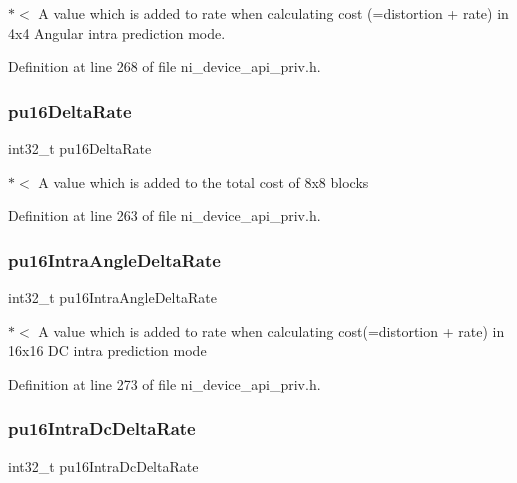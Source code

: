 $\ast$$<$ A value which is added to rate when calculating cost (=distortion + rate) in 4x4 Angular intra prediction mode. 

Definition at line 268 of file ni\+\_\+device\+\_\+api\+\_\+priv.\+h.

\mbox{\label{struct__ni__t408__config__t_adc44d5a2d0598f813ab5e3a9942782fc}} 
\subsubsection{\texorpdfstring{pu16DeltaRate}{pu16DeltaRate}}
{\footnotesize\ttfamily int32\+\_\+t pu16\+Delta\+Rate}

$\ast$$<$ A value which is added to the total cost of 8x8 blocks 

Definition at line 263 of file ni\+\_\+device\+\_\+api\+\_\+priv.\+h.

\mbox{\label{struct__ni__t408__config__t_a74fedc2585cafbacf70babe0a91d9cbb}} 
\subsubsection{\texorpdfstring{pu16IntraAngleDeltaRate}{pu16IntraAngleDeltaRate}}
{\footnotesize\ttfamily int32\+\_\+t pu16\+Intra\+Angle\+Delta\+Rate}

$\ast$$<$ A value which is added to rate when calculating cost(=distortion + rate) in 16x16 DC intra prediction mode 

Definition at line 273 of file ni\+\_\+device\+\_\+api\+\_\+priv.\+h.

\mbox{\label{struct__ni__t408__config__t_a16b2591ea7834c567480a458550af6f5}} 
\subsubsection{\texorpdfstring{pu16IntraDcDeltaRate}{pu16IntraDcDeltaRate}}
{\footnotesize\ttfamily int32\+\_\+t pu16\+Intra\+Dc\+Delta\+Rate}

